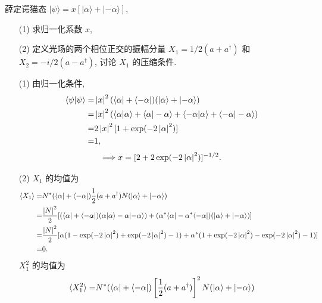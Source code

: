 \documentclass{assignment}
\begin{document}
\begin{prob}
    薛定谔猫态 $\lvert\psi\rangle=x[\lvert\alpha\rangle+\lvert-\alpha\rangle]$,
    \begin{itemize}
        \item[(1)] 求归一化系数 $x$,
        \item[(2)] 定义光场的两个相位正交的振幅分量 $X_1=1/2(a+a^{\dagger})$ 和 $X_2=-i/2(a-a^{\dagger})$, 讨论 $X_1$ 的压缩条件.
    \end{itemize}
\end{prob}
\begin{sol}
    \begin{itemize}
        \item[(1)] 由归一化条件,
        \begin{align}
            \notag\langle\psi\vert\psi\rangle=&\left\lvert x\right\rvert^2(\langle\alpha\rvert+\langle-\alpha\rvert)(\lvert\alpha\rangle+\lvert-\alpha\rangle)\\
            \notag=&\left\lvert x\right\rvert^2(\langle\alpha\vert\alpha\rangle+\langle\alpha\vert-\alpha\rangle+\langle-\alpha\vert\alpha\rangle+\langle-\alpha\rvert-\alpha\rangle)\\
            \notag=&2\left\lvert x\right\rvert^2[1+\exp(-2\left\lvert\alpha\right\rvert^2)]\\
            =&1,
        \end{align}
        \begin{align}
            \Longrightarrow x=[2+2\exp(-2\left\lvert\alpha\right\rvert^2)]^{-1/2}.
        \end{align}
        \item[(2)] $X_1$ 的均值为
        \begin{align}
            \notag\langle X_1\rangle=&N^*(\langle\alpha\rvert+\langle-\alpha\rvert)\frac{1}{2}(a+a^{\dagger})N(\lvert\alpha\rangle+\lvert-\alpha\rangle)\\
            \notag=&\frac{\left\lvert N\right\rvert^2}{2}[(\langle\alpha\rvert+\langle-\alpha\rvert)(\alpha\lvert\alpha\rangle-\alpha\lvert-\alpha\rangle)+(\alpha^*\langle\alpha\rvert-\alpha^*\langle-\alpha\rvert)(\lvert\alpha\rangle+\lvert-\alpha\rangle)]\\
            \notag=&\frac{\left\lvert N\right\rvert^2}{2}[\alpha(1-\exp(-2\left\lvert\alpha\right\rvert^2)+\exp(-2\left\lvert\alpha\right\rvert^2)-1)+\alpha^*(1+\exp(-2\left\lvert\alpha\right\rvert^2)-\exp(-2\left\lvert\alpha\right\rvert^2)-1)]\\
            =&0.
        \end{align}
        $X_1^2$ 的均值为
        \begin{align}
            \notag\langle X_1^2\rangle=&N^*(\langle\alpha\rvert+\langle-\alpha\rvert)\left[\frac{1}{2}(a+a^{\dagger})\right]^2N(\lvert\alpha\rangle+\lvert-\alpha\rangle)\\

\end{align}
\end{itemize}
\end{sol}
\end{document}

